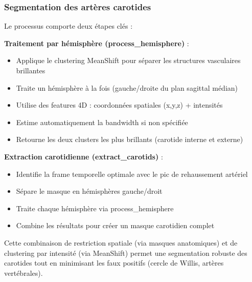 \documentclass{article}
\begin{document}
            \subsubsection*{Segmentation des artères carotides}
                Le processus comporte deux étapes clés :

                \textbf{Traitement par hémisphère (process\_hemisphere)} :
                \begin{itemize}
                    \item Applique le clustering MeanShift pour séparer les structures vasculaires brillantes
                    \item Traite un hémisphère à la fois (gauche/droite du plan sagittal médian)
                    \item Utilise des features 4D : coordonnées spatiales (x,y,z) + intensités
                    \item Estime automatiquement la bandwidth si non spécifiée
                    \item Retourne les deux clusters les plus brillants (carotide interne et externe)
                \end{itemize}
                
                \vspace{1em} 
                \hspace{0em}\textbf{Extraction carotidienne (extract\_carotids)} :
                \begin{itemize}
                    \item Identifie la frame temporelle optimale avec le pic de rehaussement artériel
                    \item Sépare le masque en hémisphères gauche/droit
                    \item Traite chaque hémisphère via process\_hemisphere
                    \item Combine les résultats pour créer un masque carotidien complet
                \end{itemize}

            Cette combinaison de restriction spatiale (via masques anatomiques) et de clustering par intensité (via MeanShift) permet une segmentation robuste des carotides tout en minimisant les faux positifs (cercle de Willis, artères vertébrales).
            
\end{document}
